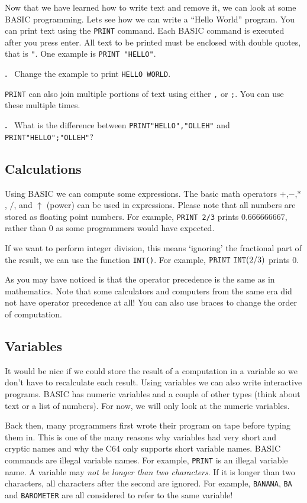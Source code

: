 \documentclass{article}
\newcounter{problem}
\newcounter{solution}
\newcommand\problem{%
  \stepcounter{problem}%
  \textbf{\theproblem.}~%
  \setcounter{solution}{0}%
}
\begin{document}
Now that we have learned how to write text and remove it, we can look at some BASIC programming.
Lets see how we can write a ``Hello World'' program.
You can print text using the \verb:PRINT: command.
Each BASIC command is executed after you press enter.
All text to be printed must be enclosed with double quotes, that is \verb:":.
One example is \verb:PRINT "HELLO":.

\problem Change the example to print \verb:HELLO WORLD:.

\verb:PRINT: can also join multiple portions of text using either \verb:,: or \verb:;:.
You can use these multiple times.

\problem What is the difference between \verb:PRINT"HELLO","OLLEH": and \verb:PRINT"HELLO";"OLLEH":?

\subsection{Calculations}

Using BASIC we can compute some expressions.
The basic math operators $+$,$-$,$*$, $/$, and $\uparrow$ (power) can be used in expressions.
Please note that all numbers are stored as floating point numbers.
For example, \verb:PRINT 2/3: prints $0.666666667$, rather than $0$ as some programmers would have expected.

If we want to perform integer division, this means `ignoring' the fractional part of the result,
we can use the function \verb:INT():.
For example, $\verb:PRINT:\ \verb:INT:(2/3)$ prints $0$.

As you may have noticed is that the operator precedence is the same as in mathematics.
Note that some calculators and computers from the same era did not have operator precedence at all!
You can also use braces to change the order of computation.

\subsection{Variables}

It would be nice if we could store the result of a computation in a variable so we don't have to recalculate each result.
Using variables we can also write interactive programs.
BASIC has numeric variables and a couple of other types (think about text or a list of numbers).
For now, we will only look at the numeric variables.

Back then, many programmers first wrote their program on tape before typing them in.
This is one of the many reasons why variables had very short and cryptic names and why the C64 only supports short variable names.
BASIC commands are illegal variable names. For example, \verb:PRINT: is an illegal variable name.
A variable may \emph{not be longer than two characters}.
If it is longer than two characters, all characters after the second are ignored.
For example, \verb:BANANA:, \verb:BA: and \verb:BAROMETER: are all considered to refer to the same variable!
\end{document}
